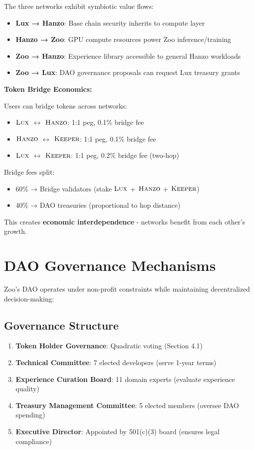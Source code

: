 \documentclass[11pt,letterpaper]{article}
\theoremstyle{definition}
\theoremstyle{remark}
\newcommand{\KEEPER}{\textsc{Keeper}}
\newcommand{\Hanzo}{\textsc{Hanzo}}
\newcommand{\Lux}{\textsc{Lux}}
\begin{document}
The three networks exhibit symbiotic value flows:

\begin{itemize}
\item \textbf{Lux → Hanzo}: Base chain security inherits to compute layer
\item \textbf{Hanzo → Zoo}: GPU compute resources power Zoo inference/training
\item \textbf{Zoo → Hanzo}: Experience library accessible to general Hanzo workloads
\item \textbf{Zoo → Lux}: DAO governance proposals can request Lux treasury grants
\end{itemize}

\textbf{Token Bridge Economics:}

Users can bridge tokens across networks:
\begin{itemize}
\item $\Lux$ $\leftrightarrow$ $\Hanzo$: 1:1 peg, 0.1\% bridge fee
\item $\Hanzo$ $\leftrightarrow$ $\KEEPER$: 1:1 peg, 0.1\% bridge fee
\item $\Lux$ $\leftrightarrow$ $\KEEPER$: 1:1 peg, 0.2\% bridge fee (two-hop)
\end{itemize}

Bridge fees split:
\begin{itemize}
\item 60\% → Bridge validators (stake $\Lux$ + $\Hanzo$ + $\KEEPER$)
\item 40\% → DAO treasuries (proportional to hop distance)
\end{itemize}

This creates \textbf{economic interdependence} - networks benefit from each other's growth.

\section{DAO Governance Mechanisms}

Zoo's DAO operates under non-profit constraints while maintaining decentralized decision-making:

\subsection{Governance Structure}

\begin{enumerate}
\item \textbf{Token Holder Governance}: Quadratic voting (Section 4.1)
\item \textbf{Technical Committee}: 7 elected developers (serve 1-year terms)
\item \textbf{Experience Curation Board}: 11 domain experts (evaluate experience quality)
\item \textbf{Treasury Management Committee}: 5 elected members (oversee DAO spending)
\item \textbf{Executive Director}: Appointed by 501(c)(3) board (ensures legal compliance)
\end{enumerate}
\end{document}
